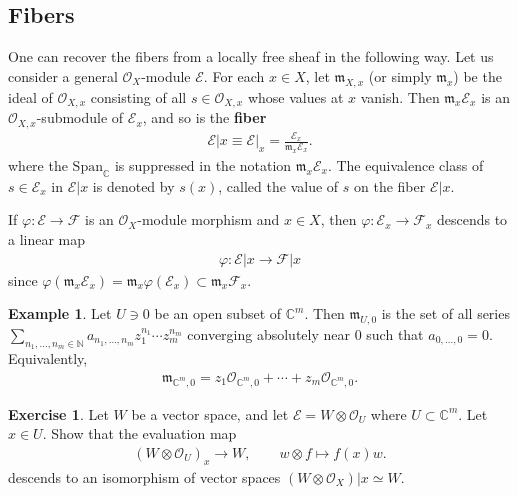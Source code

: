 \documentclass[11pt,b5paper,notitlepage]{article}
\theoremstyle{definition}
\newtheorem{eg}[df]{Example}
\newtheorem{exe}[df]{Exercise}
\theoremstyle{plain}
\newcommand{\fk}{\mathfrak}
\newcommand{\Span}{\mathrm{Span}}
\newcommand{\scr}{\mathscr}
\newcommand{\Cbb}{\mathbb C}
\newcommand{\Nbb}{\mathbb N}
\numberwithin{equation}{section}
\begin{document}
\subsection{Fibers}

One can recover the fibers from a locally free sheaf in the following way. Let us consider a general $\scr O_X$-module $\scr E$. For each $x\in X$, let $\fk m_{X,x}$ (or simply $\fk m_x$) \index{mx@$\fk m_{X,x}\equiv\fk m_x$} be the ideal of $\scr O_{X,x}$ consisting of all $s\in\scr O_{X,x}$ whose values at $x$ vanish. Then $\fk m_x\scr E_x$ is an $\scr O_{X,x}$-submodule of $\scr E_x$, and so is the \textbf{fiber} \index{Ex@$\scr E\lvert x=\scr E\lvert_x,s(x)$}
\begin{align}
\scr E|x\equiv\scr E|_x=\frac{\scr E_x}{\fk m_x\scr E_x}.
\end{align} 
where the $\Span_\Cbb$ is suppressed in the notation $\fk m_x\scr E_x$. The equivalence class of $s\in\scr E_x$ in $\scr E|x$ is denoted by $s(x)$, called the value of $s$ on the fiber $\scr E|x$.

If $\varphi:\scr E\rightarrow\scr F$ is an $\scr O_X$-module morphism and $x\in X$, then $\varphi:\scr E_x\rightarrow\scr F_x$ descends to a linear map
\begin{align}
	\varphi:\scr E|x\rightarrow\scr F|x	
\end{align}
since $\varphi(\fk m_x\scr E_x)=\fk m_x\varphi(\scr E_x)\subset\fk m_x\scr F_x$. 

\begin{eg}
Let $U\ni 0$ be an open subset of $\Cbb^m$. Then $\fk m_{U,0}$ is the set of all series $\sum_{n_1,\dots,n_m\in \Nbb}a_{n_1,\dots,n_m}z_1^{n_1}\cdots z_m^{n_m}$ converging absolutely near $0$ such that $a_{0,\dots,0}=0$. Equivalently,
\begin{align*}
\fk m_{\Cbb^m,0}=z_1\scr O_{\Cbb^m,0}+\cdots+z_m\scr O_{\Cbb^m,0}.	
\end{align*}
\end{eg}

\begin{exe}
Let $W$ be a vector space, and let $\scr E=W\otimes\scr O_U$ where $U\subset\Cbb^m$. Let $x\in U$.  Show that the evaluation map
\begin{align}
(W\otimes\scr O_U)_x\rightarrow W, \qquad w\otimes f\mapsto f(x)w.	
\end{align}
descends to an isomorphism of vector spaces $(W\otimes\scr O_X)\big|x\simeq W$.
\end{exe}
\end{document}
